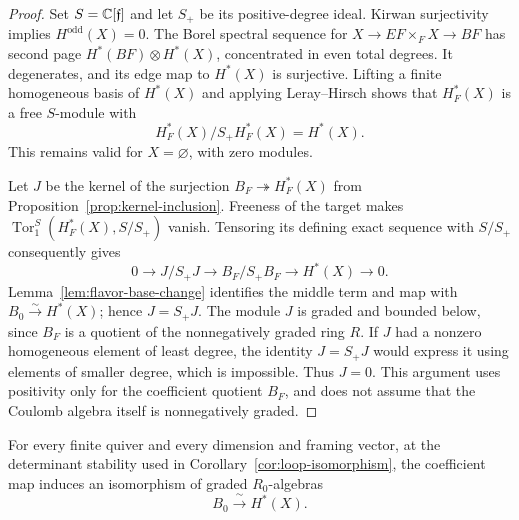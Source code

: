 \begin{proof}
Set $S=\mathbb C[\mathfrak f]$ and let $S_+$ be its positive-degree ideal.
Kirwan surjectivity implies $H^{\mathrm{odd}}(X)=0$.
The Borel spectral sequence for $X\to EF\times_F X\to BF$ has second page
$H^*(BF)\otimes H^*(X)$, concentrated in even total degrees.  It degenerates,
and its edge map to $H^*(X)$ is surjective.  Lifting a finite homogeneous
basis of $H^*(X)$ and applying Leray--Hirsch shows that $H_F^*(X)$ is a free
$S$-module with
\[
 H_F^*(X)/S_+H_F^*(X)=H^*(X).
\]
This remains valid for $X=\varnothing$, with zero modules.

Let $J$ be the kernel of the surjection
$B_F\twoheadrightarrow H_F^*(X)$ from
Proposition~\ref{prop:kernel-inclusion}.  Freeness of the target makes
$\operatorname{Tor}_1^S(H_F^*(X),S/S_+)$ vanish.  Tensoring its defining exact
sequence with $S/S_+$ consequently gives
\[
 0\longrightarrow J/S_+J\longrightarrow B_F/S_+B_F
       \longrightarrow H^*(X)\longrightarrow0.
\]
Lemma~\ref{lem:flavor-base-change} identifies the middle term and map with
$B_0\xrightarrow{\sim}H^*(X)$; hence $J=S_+J$.
The module $J$ is graded and bounded below, since $B_F$ is a quotient of the
nonnegatively graded ring $R$.  If $J$ had a nonzero homogeneous element of
least degree, the identity $J=S_+J$ would express it using elements of smaller
degree, which is impossible.  Thus $J=0$.
This argument uses positivity only for the coefficient quotient $B_F$, and
does not assume that the Coulomb algebra itself is nonnegatively graded.
\end{proof}

\begin{proposition}\label{prop:loop-removal}
For every finite quiver and every dimension and framing vector, at the
determinant stability used in Corollary~\ref{cor:loop-isomorphism}, the
coefficient map induces an isomorphism of graded $R_0$-algebras
\[
 B_0\xrightarrow{\ \sim\ }H^*(X).
\]
\end{proposition}

